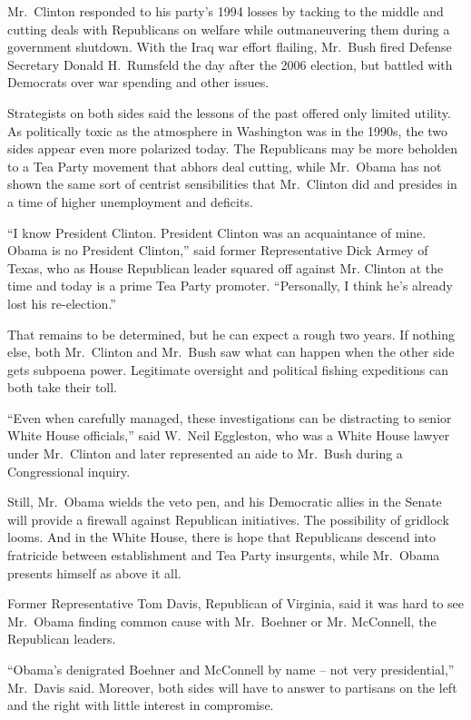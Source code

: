 ﻿\documentclass[12pt]{article}
\begin{document}
Mr.~Clinton responded to his party's 1994 losses by tacking to the middle and cutting deals with
Republicans on welfare while outmaneuvering them during a government shutdown. With the Iraq war
effort flailing, Mr.~Bush fired Defense Secretary Donald H.~Rumsfeld the day after the 2006
election, but battled with Democrats over war spending and other issues.

Strategists on both sides said the lessons of the past offered only limited utility. As politically
toxic as the atmosphere in Washington was in the 1990s, the two sides appear even more polarized
today. The Republicans may be more beholden to a Tea Party movement that abhors deal cutting, while
Mr.~Obama has not shown the same sort of centrist sensibilities that Mr.~Clinton did and presides in
a time of higher unemployment and deficits.

``I know President Clinton. President Clinton was an acquaintance of mine. Obama is no President
Clinton,'' said former Representative Dick Armey of Texas, who as House Republican leader squared
off against Mr. Clinton at the time and today is a prime Tea Party promoter. ``Personally, I think
he's already lost his re-election.''

That remains to be determined, but he can expect a rough two years. If nothing else, both
Mr.~Clinton and Mr.~Bush saw what can happen when the other side gets subpoena power. Legitimate
oversight and political fishing expeditions can both take their toll.

``Even when carefully managed, these investigations can be distracting to senior White House
officials,'' said W.~Neil Eggleston, who was a White House lawyer under Mr.~Clinton and later
represented an aide to Mr.~Bush during a Congressional inquiry.

Still, Mr.~Obama wields the veto pen, and his Democratic allies in the Senate will provide a
firewall against Republican initiatives. The possibility of gridlock looms. And in the White House,
there is hope that Republicans descend into fratricide between establishment and Tea Party
insurgents, while Mr.~Obama presents himself as above it all.

Former Representative Tom Davis, Republican of Virginia, said it was hard to see Mr.~Obama finding
common cause with Mr.~Boehner or Mr. McConnell, the Republican leaders.

``Obama's denigrated Boehner and McConnell by name -- not very presidential,'' Mr.~Davis said.
Moreover, both sides will have to answer to partisans on the left and the right with little interest
in compromise.
\end{document}
